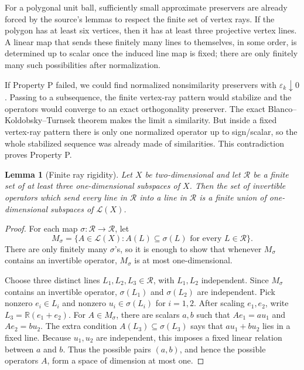 \documentclass[11pt]{article}
\newtheorem{lemma}{Lemma}
\newcommand{\eps}{\varepsilon}
\newcommand{\R}{\mathbb R}
\newcommand{\cL}{\mathcal L}
\begin{document}
For a polygonal unit ball, sufficiently small approximate preservers are already
forced by the source's lemmas to respect the finite set of vertex rays.  If the
polygon has at least six vertices, then it has at least three projective vertex
lines.  A linear map that sends these finitely many lines to themselves, in some
order, is determined up to scalar once the induced line map is fixed; there are
only finitely many such possibilities after normalization.

If Property P failed, we could find normalized nonsimilarity preservers with
\(\eps_k\downarrow0\).  Passing to a subsequence, the finite vertex-ray pattern
would stabilize and the operators would converge to an exact orthogonality
preserver.  The exact Blanco--Koldobsky--Turnsek theorem makes the limit a
similarity.  But inside a fixed vertex-ray pattern there is only one normalized
operator up to sign/scalar, so the whole stabilized sequence was already made of
similarities.  This contradiction proves Property P.

\begin{lemma}[Finite ray rigidity]
Let \(X\) be two-dimensional and let \(\mathcal R\) be a finite set of at least
three one-dimensional subspaces of \(X\).  Then the set of invertible operators
which send every line in \(\mathcal R\) into a line in \(\mathcal R\) is a finite
union of one-dimensional subspaces of \(\cL(X)\).
\end{lemma}

\begin{proof}
For each map \(\sigma:\mathcal R\to\mathcal R\), let
\[
  M_\sigma=\{A\in\cL(X): A(L)\subseteq \sigma(L)\text{ for every }L\in\mathcal R\}.
\]
There are only finitely many \(\sigma\)'s, so it is enough to show that whenever
\(M_\sigma\) contains an invertible operator, \(M_\sigma\) is at most
one-dimensional.

Choose three distinct lines \(L_1,L_2,L_3\in\mathcal R\), with \(L_1,L_2\)
independent.  Since \(M_\sigma\) contains an invertible operator,
\(\sigma(L_1)\) and \(\sigma(L_2)\) are independent.  Pick nonzero
\(e_i\in L_i\) and nonzero \(u_i\in\sigma(L_i)\) for \(i=1,2\).  After scaling
\(e_1,e_2\), write \(L_3=\R(e_1+e_2)\).  For \(A\in M_\sigma\), there are
scalars \(a,b\) such that \(Ae_1=a u_1\) and \(Ae_2=b u_2\).  The extra
condition \(A(L_3)\subseteq\sigma(L_3)\) says that \(a u_1+b u_2\) lies in a
fixed line.  Because \(u_1,u_2\) are independent, this imposes a fixed linear
relation between \(a\) and \(b\).  Thus the possible pairs \((a,b)\), and hence
the possible operators \(A\), form a space of dimension at most one.
\end{proof}
\end{document}
